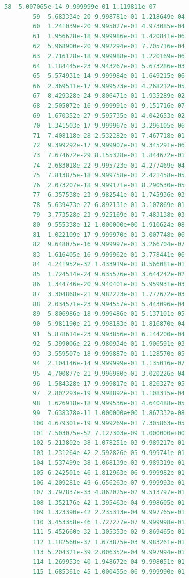 \documentclass[12pt, a4paper, oneside]{ctexart}
\begin{document}
\begin{appendices}
\begin{lstlisting}[language=R, caption={训练好的模型对鸢尾花数据集的预测结果}, label=predictIris]
		58  5.007065e-14 9.999999e-01 1.119811e-07
		59  5.683334e-20 9.998781e-01 1.218649e-04
		60  1.241039e-20 9.995027e-01 4.973085e-04
		61  1.956628e-18 9.999986e-01 1.420841e-06
		62  5.968900e-20 9.992294e-01 7.705716e-04
		63  2.716128e-18 9.999988e-01 1.220169e-06
		64  1.184445e-23 9.943267e-01 5.673286e-03
		65  5.574931e-14 9.999984e-01 1.649215e-06
		66  2.369511e-17 9.999573e-01 4.268212e-05
		67  8.429328e-24 9.806471e-01 1.935289e-02
		68  2.505072e-16 9.999991e-01 9.151716e-07
		69  1.670352e-27 9.595735e-01 4.042653e-02
		70  1.341503e-17 9.999967e-01 3.296105e-06
		71  7.408118e-28 2.532282e-01 7.467718e-01
		72  9.399292e-17 9.999907e-01 9.345291e-06
		73  7.674672e-29 8.155328e-01 1.844672e-01
		74  2.683018e-22 9.995723e-01 4.277469e-04
		75  7.813875e-18 9.999758e-01 2.421458e-05
		76  2.073207e-18 9.999171e-01 8.290530e-05
		77  6.357538e-23 9.982541e-01 1.745936e-03
		78  5.639473e-27 6.892131e-01 3.107869e-01
		79  3.773528e-23 9.925169e-01 7.483138e-03
		80  9.555338e-12 1.000000e+00 1.910624e-08
		81  1.022109e-17 9.999970e-01 3.007748e-06
		82  9.648075e-16 9.999997e-01 3.266704e-07
		83  1.616405e-16 9.999962e-01 3.778441e-06
		84  4.241952e-32 1.433919e-01 8.566081e-01
		85  1.724514e-24 9.635576e-01 3.644242e-02
		86  1.344746e-20 9.940401e-01 5.959931e-03
		87  3.304868e-21 9.982223e-01 1.777672e-03
		88  2.034571e-23 9.994557e-01 5.443096e-04
		89  5.806986e-18 9.999486e-01 5.137101e-05
		90  5.981190e-21 9.998183e-01 1.816870e-04
		91  5.878614e-23 9.993856e-01 6.144200e-04
		92  5.399006e-22 9.980934e-01 1.906591e-03
		93  3.559507e-18 9.999887e-01 1.128570e-05
		94  2.104146e-14 9.999999e-01 1.135016e-07
		95  4.700877e-21 9.996980e-01 3.020226e-04
		96  1.584328e-17 9.999817e-01 1.826327e-05
		97  2.802293e-19 9.998892e-01 1.108315e-04
		98  1.626918e-18 9.999536e-01 4.640488e-05
		99  7.638378e-11 1.000000e+00 1.867332e-08
		100 4.679301e-19 9.999269e-01 7.305863e-05
		101 7.503075e-52 7.127303e-09 1.000000e+00
		102 5.213802e-38 1.078251e-03 9.989217e-01
		103 1.231264e-42 2.592826e-05 9.999741e-01
		104 1.537499e-38 1.068139e-03 9.989319e-01
		105 6.242501e-46 1.812963e-06 9.999982e-01
		106 4.209281e-49 6.656263e-07 9.999993e-01
		107 3.797837e-33 4.862025e-02 9.513797e-01
		108 1.352176e-42 1.395463e-04 9.998605e-01
		109 1.323390e-42 2.235313e-04 9.997765e-01
		110 3.453358e-46 1.727277e-07 9.999998e-01
		111 5.452660e-32 1.305353e-02 9.869465e-01
		112 1.182560e-37 1.673875e-03 9.983261e-01
		113 5.204321e-39 2.006352e-04 9.997994e-01
		114 1.269953e-40 1.948672e-04 9.998051e-01
		115 1.685361e-45 1.000455e-06 9.999990e-01

\end{lstlisting}
\end{appendices}
\end{document}

